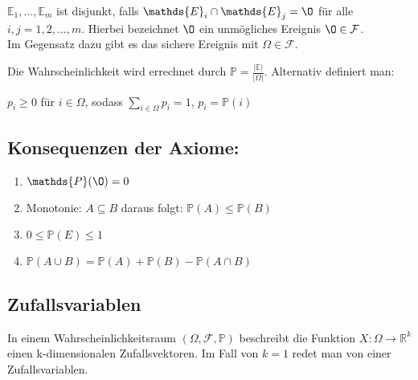 $\mathds{E}_{1},...,\mathds{E}_{m}$ ist disjunkt, falls $\mathds{E}_{i} \cap \mathds{E}_{j} = \O$ f\"ur alle $i,j= 1,2,...,m$. 
Hierbei bezeichnet $\O$ ein unm\"ogliches Ereignis $\O \in \mathcal{F}$. \\ Im Gegensatz dazu gibt es das sichere Ereignis mit ${\Omega} \in \mathcal{F}$.

\vspace{5pt}

Die Wahrscheinlichkeit wird errechnet durch $ \mathds{P} = \frac {|\mathds{E}|}{|\Omega|}$.
Alternativ definiert man: 

\vspace{5pt}


$p_{i} \geq 0$  f\"ur $i \in \Omega$, sodass $\sum_{i\in \Omega} p_{i} =1$, $p_{i} = \mathds{P} ({i})$



\vspace{10pt}

\subsection *{Konsequenzen der Axiome:}

\vspace{5pt}

\begin{enumerate}
	\item $\mathds{P} (\O) = 0$
	\item Monotonie: $A\subseteq B$ daraus folgt: $\mathds{P} (A) \leq \mathds{P} (B)$
	\item $0 \leq \mathds{P} (E) \leq 1$
	\item $ \mathds{P} (A \cup B) = \mathds{P} (A) + \mathds{P} (B) - \mathds{P} (A \cap B)$
\end{enumerate}


\vspace{10pt}

\subsection *{Zufallsvariablen}

\vspace{5pt}

In einem Wahrscheinlichkeitsraum $(\Omega, \mathcal{F}, \mathds{P})$ beschreibt die Funktion $X:\Omega \longrightarrow \mathds{R}^k$ einen k-dimensionalen Zufallsvektoren. Im Fall von $k=1$ redet man von einer Zufallsvariablen.

\vspace{10pt}

